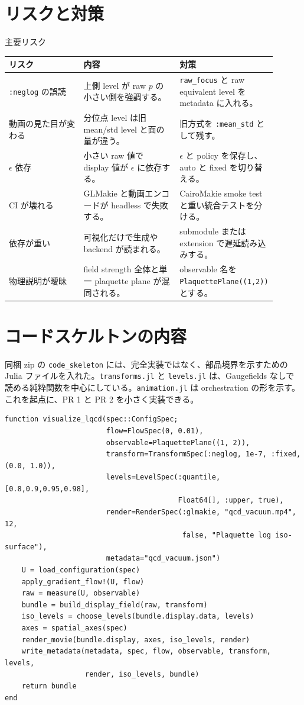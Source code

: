 \documentclass[uplatex,dvipdfmx,ja=standard,11pt,a4paper]{bxjsarticle}
\newcommand{\code}[1]{\texttt{#1}}
\begin{document}
\section{リスクと対策}
\begin{riskbox}{主要リスク}
\begin{longtable}{p{0.28\linewidth}p{0.36\linewidth}p{0.26\linewidth}}
\toprule
リスク & 内容 & 対策 \\
\midrule
\code{:neglog} の誤読 & 上側 level が raw \(p\) の小さい側を強調する。 & \code{raw\_focus} と raw equivalent level を metadata に入れる。 \\
動画の見た目が変わる & 分位点 level は旧 mean/std level と面の量が違う。 & 旧方式を \code{:mean\_std} として残す。 \\
\(\epsilon\) 依存 & 小さい raw 値で display 値が \(\epsilon\) に依存する。 & \(\epsilon\) と policy を保存し、auto と fixed を切り替える。 \\
CI が壊れる & GLMakie と動画エンコードが headless で失敗する。 & CairoMakie smoke test と重い統合テストを分ける。 \\
依存が重い & 可視化だけで生成や backend が読まれる。 & submodule または extension で遅延読み込みする。 \\
物理説明が曖昧 & field strength 全体と単一 plaquette plane が混同される。 & observable 名を \code{PlaquettePlane((1,2))} とする。 \\
\bottomrule
\end{longtable}
\end{riskbox}

\section{コードスケルトンの内容}
同梱 zip の \code{code\_skeleton} には、完全実装ではなく、部品境界を示すための Julia ファイルを入れた。\code{transforms.jl} と \code{levels.jl} は、Gaugefields なしで読める純粋関数を中心にしている。\code{animation.jl} は orchestration の形を示す。これを起点に、PR 1 と PR 2 を小さく実装できる。

\begin{lstlisting}[style=julia,caption={orchestration の骨子}]
function visualize_lqcd(spec::ConfigSpec;
                        flow=FlowSpec(0, 0.01),
                        observable=PlaquettePlane((1, 2)),
                        transform=TransformSpec(:neglog, 1e-7, :fixed, (0.0, 1.0)),
                        levels=LevelSpec(:quantile, [0.8,0.9,0.95,0.98],
                                         Float64[], :upper, true),
                        render=RenderSpec(:glmakie, "qcd_vacuum.mp4", 12,
                                          false, "Plaquette log iso-surface"),
                        metadata="qcd_vacuum.json")
    U = load_configuration(spec)
    apply_gradient_flow!(U, flow)
    raw = measure(U, observable)
    bundle = build_display_field(raw, transform)
    iso_levels = choose_levels(bundle.display.data, levels)
    axes = spatial_axes(spec)
    render_movie(bundle.display, axes, iso_levels, render)
    write_metadata(metadata, spec, flow, observable, transform, levels,
                   render, iso_levels, bundle)
    return bundle
end
\end{lstlisting}
\end{document}
